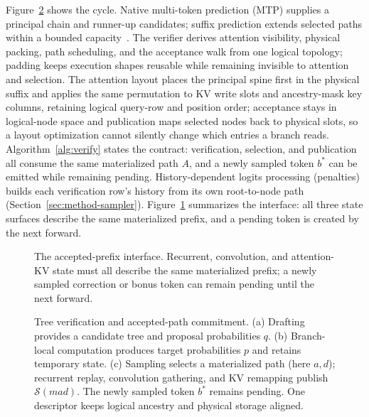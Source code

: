\documentclass[sigconf,anonymous,review]{acmart}
\begin{document}
Figure~\ref{fig:pipeline} shows the cycle. Native multi-token prediction (MTP) supplies a principal chain and runner-up candidates; suffix prediction extends selected paths within a bounded capacity~\cite{oliaro2025suffix,arctic2026suffix,hu2024sam}. The verifier derives attention visibility, physical packing, path scheduling, and the acceptance walk from one logical topology; padding keeps execution shapes reusable while remaining invisible to attention and selection. The attention layout places the principal spine first in the physical suffix and applies the same permutation to KV write slots and ancestry-mask key columns, retaining logical query-row and position order; acceptance stays in logical-node space and publication maps selected nodes back to physical slots, so a layout optimization cannot silently change which entries a branch reads. Algorithm~\ref{alg:verify} states the contract: verification, selection, and publication all consume the same materialized path $A$, and a newly sampled token $b^*$ can be emitted while remaining pending. History-dependent logits processing (penalties) builds each verification row's history from its own root-to-node path (Section~\ref{sec:method-sampler}). Figure~\ref{fig:contract} summarizes the interface: all three state surfaces describe the same materialized prefix, and a pending token is created by the next forward.

\begin{figure}[t]
\centering

\caption{The accepted-prefix interface. Recurrent, convolution, and attention-KV state must all describe the same materialized prefix; a newly sampled correction or bonus token can remain pending until the next forward.}
\label{fig:contract}
\end{figure}

\begin{figure}[t]
\centering
\resizebox{\textwidth}{!}{}
\caption{Tree verification and accepted-path commitment. (a) Drafting provides a candidate tree and proposal probabilities $q$. (b) Branch-local computation produces target probabilities $p$ and retains temporary state. (c) Sampling selects a materialized path (here $a,d$); recurrent replay, convolution gathering, and KV remapping publish $\mathcal{S}(mad)$. The newly sampled token $b^*$ remains pending. One descriptor keeps logical ancestry and physical storage aligned.}
\label{fig:pipeline}
\end{figure}
\end{document}
